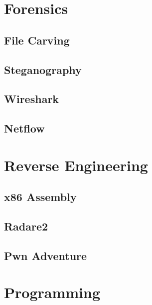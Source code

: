 \documentclass[a4paper,11pt]{report}
\begin{document}
\chapter{Forensics}
	\section{File Carving}
	\section{Steganography}
	\section{Wireshark}
	\section{Netflow}
\chapter{Reverse Engineering}
	\section{x86 Assembly}
	\section{Radare2}
	\section{Pwn Adventure}
\chapter{Programming}
\end{document}

